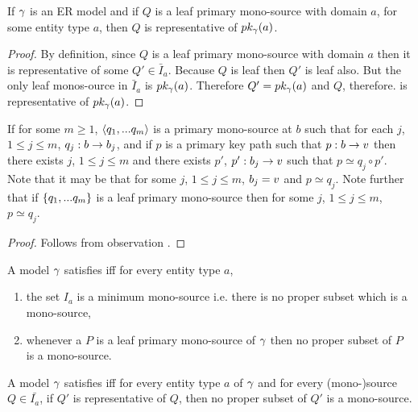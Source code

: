 \begin{lemma}
If $\gamma$ is an ER model and if $Q$ is a leaf primary mono-source with domain $a$, for some entity type $a$, then $Q$ is representative of $pk_{\gamma}(a)$.
\end{lemma}
\begin{proof}
By definition, since $Q$ is a leaf primary mono-source with domain $a$ then it is representative of some $Q' \in \bar{I}_a$. Because
$Q$ is leaf then $Q'$ is leaf also. But the only leaf monos-ource in $\bar{I}_a$ is $pk_{\gamma}(a)$. Therefore $Q'=pk_{\gamma}(a)$ and $Q$, therefore.
is representative of  $pk_{\gamma}(a)$.
\end{proof}


\begin{lemma}
If for some $m \geq 1$, $\langle q_1,...q_m\rangle$ is a primary mono-source at $b$ such that for each $j$, $1 \leq j \leq m$, $q_j : b \rightarrow b_j$,
and if  $p$ is a primary key path such that $p: b \rightarrow v$   
then there exists $j$, $1 \leq j \leq m$ and there exists $p'$, $p': b_j \rightarrow v$ such that $p \simeq q_j \circ p'$.
Note that it may be that for some $j$, $1 \leq j \leq m$, $b_j = v$ and $p \simeq q_j$.
Note further that if $\left\{q_1,...q_m\right\}$ is a leaf primary mono-source then for some $j$, $1 \leq j \leq m$, $p \simeq q_j$.
\end{lemma}
\begin{proof}
Follows from observation .
\end{proof}

\begin{definition}
A model $\gamma$ satisfies  iff for every entity type $a$,
\begin{enumerate}
\item the set $I_a$ is a minimum mono-source i.e. there is no proper subset which is a mono-source,
\item whenever a  $P$ is a leaf primary mono-source of $\gamma$ then no proper subset of $P$ is a mono-source.
\end{enumerate}
\end{definition}

\begin{conjecture}
A model $\gamma$ satisfies  iff 
for every entity type $a$ of $\gamma$ and for every (mono-)source $Q \in \bar{I_a}$, if $Q'$ is representative
of  $Q$, then no proper subset of $Q'$ is a mono-source. 
\end{conjecture}

